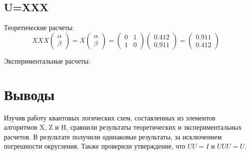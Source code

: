 \documentclass{article}
\begin{document}
\subsection{U=XXX}

Теоретические расчеты:
\begin{equation}
  XXX\begin{pmatrix} \alpha\\ \beta \end{pmatrix} = X\begin{pmatrix} \alpha\\
  \beta \end{pmatrix}=\begin{pmatrix} 0 & 1 \\ 1 & 0
  \end{pmatrix}\begin{pmatrix} 0.412 \\ 0.911 \end{pmatrix}=\begin{pmatrix}
  0.911\\0.412 \end{pmatrix}
\end{equation}

Экспериментальные расчеты:

\begin{figure}[H]
\end{figure}

\section{Выводы}

Изучив работу квантовых логических схем, составленных из элементов алгоритмов
X, Z и H, сравнили результаты теоретических и экспериментальных расчетов. В
результате получили одинаковые результаты, за исключением погрешности
округления. Также проверили утверждение, что $UU=I$ и $UUU=U$.
\end{document}
